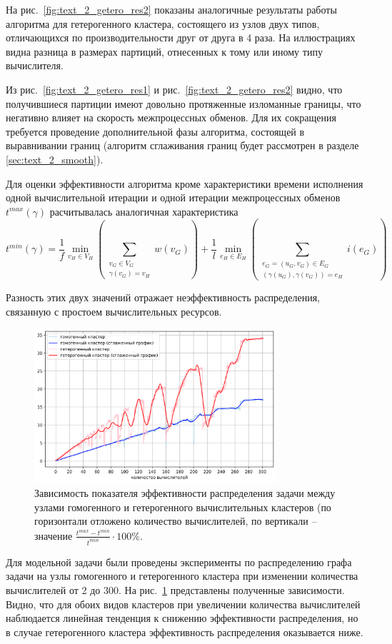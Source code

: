 На рис.~\ref{fig:text_2_getero_res2} показаны аналогичные результаты работы алгоритма для гетерогенного кластера, состоящего из узлов двух типов, отличающихся по производительности друг от друга в 4 раза.
На иллюстрациях видна разница в размерах партиций, отнесенных к тому или иному типу вычислителя.

Из рис.~\ref{fig:text_2_getero_res1} и рис.~\ref{fig:text_2_getero_res2} видно, что получившиеся партиции имеют довольно протяженные изломанные границы, что негативно влияет на скорость межпроцессных обменов.
Для их сокращения требуется проведение дополнительной фазы алгоритма, состоящей в выравнивании границ (алгоритм сглаживания границ будет рассмотрен в разделе \ref{sec:text_2_smooth}).

Для оценки эффективности алгоритма кроме характеристики времени исполнения одной вычислительной итерации и одной итерации межпроцессных обменов $t^{max}(\gamma)$ расчитывалась аналогичная характеристика
\begin{equation}
	t^{min}(\gamma) =
		\frac{1}{f} \min_{v_H \in V_H}{\left( \sum_{\substack{v_G \in V_G \\ \gamma(v_G) = v_H}}{w(v_G)} \right)} + 
		\frac{1}{l} \min_{e_H \in E_H}{\left( \sum_{\substack{e_G = (u_G, v_G) \in E_G \\ (\gamma(u_G), \gamma(v_G)) = e_H}}{i(e_G)} \right)}
\end{equation}

Разность этих двух значений отражает неэффективность распределения, связанную с простоем вычислительных ресурсов.

\begin{figure}[H]
\centering
\includegraphics[width=0.8\textwidth]{./pics/text_2_getero/chart2.png}
\singlespacing
{}\caption{Зависимость показателя эффективности распределения задачи между узлами гомогенного и гетерогенного вычислительных кластеров (по горизонтали отложено количество вычислителей, по вертикали -- значение $\frac{t^{max} - t^{min}}{t^{min}} \cdot 100\%$.}
\label{fig:text_2_getero_chart}
\end{figure}

Для модельной задачи были проведены эксперименты по распределению графа задачи на узлы гомогенного и гетерогенного кластера при изменении количества вычислителей от 2 до 300.
На рис.~\ref{fig:text_2_getero_chart} представлены полученные зависимости.
Видно, что для обоих видов кластеров при увеличении количества вычислителей наблюдается линейная тенденция к снижению эффективности распределения, но в случае гетерогенного кластера эффективность распределения оказывается ниже.
